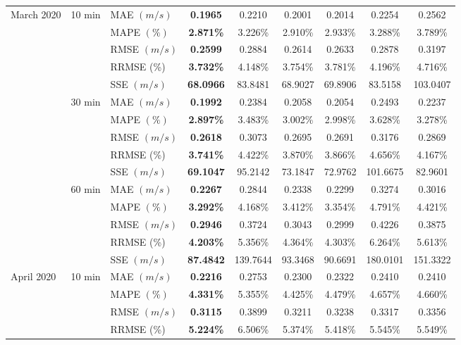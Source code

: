 {\begin{longtable}[htb!]{lllcccccc}
March 2020 & \multicolumn{1}{c}{10 min} & MAE {$(m/s)$} & \textbf{0.1965} & 0.2210 & 0.2001 & 0.2014 & 0.2254 & {0.2562} \\
 &  & MAPE {$(\%)$} & \textbf{2.871\%} & 3.226\% & 2.910\% & 2.933\% & 3.288\% & {3.789\%} \\
 &  & RMSE {$(m/s)$} & \textbf{0.2599} & 0.2884 & 0.2614 & 0.2633 & 0.2878 & {0.3197} \\
 &  & {RRMSE {(\%)}} & {\textbf{3.732\%}} & {4.148\%} & {3.754\%} & {3.781\%} & {4.196\%} & {4.716\%} \\
 &  & {SSE {$(m/s)$}} & {\textbf{68.0966}} & {83.8481} & {68.9027} & {69.8906} & {83.5158} & {103.0407} \\
 & \multicolumn{1}{c}{30 min} & MAE {$(m/s)$} & \textbf{0.1992} & 0.2384 & 0.2058 & 0.2054 & 0.2493 & {0.2237} \\
 &  & MAPE {$(\%)$} & \textbf{2.897\%} & 3.483\% & 3.002\% & 2.998\% & 3.628\% & {3.278\%} \\
 &  & RMSE {$(m/s)$} & \textbf{0.2618} & 0.3073 & 0.2695 & 0.2691 & 0.3176 & {0.2869} \\
 &  & {RRMSE {(\%)}} & {\textbf{3.741\%}} & {4.422\%} & {3.870\%} & {3.866\%} & {4.656\%} & {4.167\%} \\
 &  & {SSE {$(m/s)$}} & {\textbf{69.1047}} & {95.2142} & {73.1847} & {72.9762} & {101.6675} & {82.9601} \\
 & \multicolumn{1}{c}{60 min} & MAE {$(m/s)$} & \textbf{0.2267} & 0.2844 & 0.2338 & 0.2299 & 0.3274 & {0.3016} \\
 &  & MAPE {$(\%)$} & \textbf{3.292\%} & 4.168\% & 3.412\% & 3.354\% & 4.791\% & {4.421\%} \\
 &  & RMSE {$(m/s)$} & \textbf{0.2946} & 0.3724 & 0.3043 & 0.2999 & 0.4226 & {0.3875} \\
 &  & {RRMSE {(\%)}} & {\textbf{4.203\%}} & {5.356\%} & {4.364\%} & {4.303\%} & {6.264\%} & {5.613\%} \\
 &  & {SSE {$(m/s)$}} & {\textbf{87.4842}} & {139.7644} & {93.3468} & {90.6691} & {180.0101} & {151.3322} \\ \hline
April 2020 & \multicolumn{1}{c}{10 min} & MAE {$(m/s)$} & \textbf{0.2216} & 0.2753 & 0.2300 & 0.2322 & 0.2410 & {0.2410} \\
 &  & MAPE {$(\%)$} & \textbf{4.331\%} & 5.355\% & 4.425\% & 4.479\% & 4.657\% & {4.660\%} \\
 &  & RMSE {$(m/s)$} & \textbf{0.3115} & 0.3899 & 0.3211 & 0.3238 & 0.3317 & {0.3356} \\
 &  & {RRMSE {(\%)}} & {\textbf{5.224\%}} & {6.506\%} & {5.374\%} & {5.418\%} & {5.545\%} & {5.549\%} \\

\end{longtable}}
